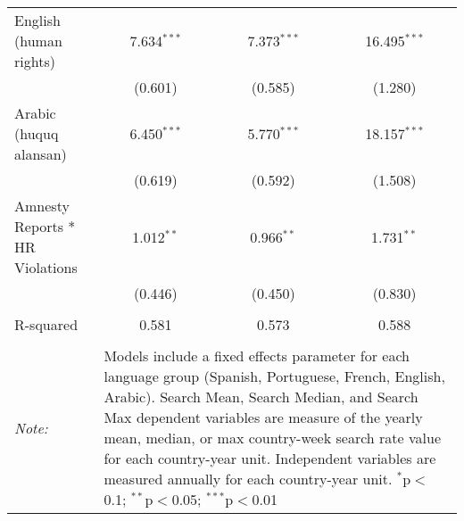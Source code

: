 \begin{table}[!htbp]
\begin{tabular}{@{\extracolsep{5pt}}lccc}
  English (human rights) & 7.634$^{***}$ & 7.373$^{***}$ & 16.495$^{***}$ \\ 
  & (0.601) & (0.585) & (1.280) \\ 
  Arabic (huquq alansan) & 6.450$^{***}$ & 5.770$^{***}$ & 18.157$^{***}$ \\ 
  & (0.619) & (0.592) & (1.508) \\ 
  Amnesty Reports * HR Violations & 1.012$^{**}$ & 0.966$^{**}$ & 1.731$^{**}$ \\ 
  & (0.446) & (0.450) & (0.830) \\ 
 \hline \\[-1.8ex] 
R-squared  & 0.581 & 0.573 & 0.588 \\ 
\hline 
\hline \\[-1.8ex] 
\textit{Note:}  & \multicolumn{3}{l}{\parbox[t]{8cm}{Models include a fixed effects parameter for each language group (Spanish, Portuguese, French, English, Arabic). Search Mean, Search Median, and Search Max dependent variables are measure of the yearly mean, median, or max country-week search rate value for each country-year unit. Independent variables are measured annually for each country-year unit. $^{*}$p$<$0.1; $^{**}$p$<$0.05; $^{***}$p$<$0.01}} \\ 
\end{tabular} 
\end{table} 
